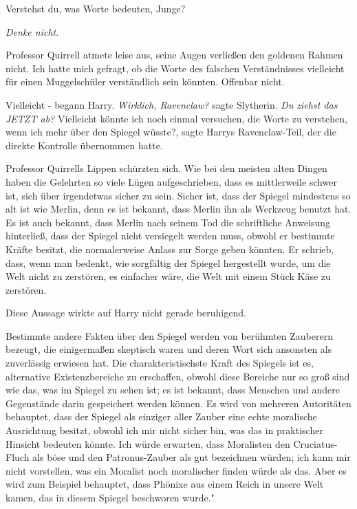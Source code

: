 \glqq{}Verstehst du, was Worte bedeuten, Junge?\grqq{}

\glqq{}\emph{Denke nicht}.\grqq{}

Professor Quirrell atmete leise aus, seine Augen verließen den goldenen Rahmen
nicht. \glqq{}Ich hatte mich gefragt, ob die Worte des falschen Verständnisses
vielleicht für einen Muggelschüler verständlich sein könnten. Offenbar
nicht.\grqq{}

\glqq{}Vielleicht -\grqq{} begann Harry. \emph{Wirklich, Ravenclaw?} sagte
Slytherin. \emph{Du ziehst das JETZT ab?} \glqq{}Vielleicht könnte ich noch
einmal versuchen, die Worte zu verstehen, wenn ich mehr über den Spiegel
wüsste?\grqq{}, sagte Harrys Ravenclaw-Teil, der die direkte Kontrolle
übernommen hatte.

Professor Quirrells Lippen schürzten sich. \glqq{}Wie bei den meisten alten
Dingen haben die Gelehrten so viele Lügen aufgeschrieben, dass es mittlerweile
schwer ist, sich über irgendetwas sicher zu sein. Sicher ist, dass der Spiegel
mindestens so alt ist wie Merlin, denn es ist bekannt, dass Merlin ihn als
Werkzeug benutzt hat. Es ist auch bekannt, dass Merlin nach seinem Tod die
schriftliche Anweisung hinterließ, dass der Spiegel nicht versiegelt werden
muss, obwohl er bestimmte Kräfte besitzt, die normalerweise Anlass zur Sorge
geben könnten. Er schrieb, dass, wenn man bedenkt, wie sorgfältig der Spiegel
hergestellt wurde, um die Welt nicht zu zerstören, es einfacher wäre, die Welt
mit einem Stück Käse zu zerstören.\grqq{}

Diese Aussage wirkte auf Harry nicht gerade beruhigend.

\glqq{}Bestimmte andere Fakten über den Spiegel werden von berühmten Zauberern
bezeugt, die einigermaßen skeptisch waren und deren Wort sich ansonsten als
zuverlässig erwiesen hat. Die charakteristischste Kraft des Spiegels ist es,
alternative Existenzbereiche zu erschaffen, obwohl diese Bereiche nur so groß
sind wie das, was im Spiegel zu sehen ist; es ist bekannt, dass Menschen und
andere Gegenstände darin gespeichert werden können. Es wird von mehreren
Autoritäten behauptet, dass der Spiegel als einziger aller Zauber eine echte
moralische Ausrichtung besitzt, obwohl ich mir nicht sicher bin, was das in
praktischer Hinsicht bedeuten könnte. Ich würde erwarten, dass Moralisten den
Cruciatus-Fluch als \glqq{}böse\grqq{} und den Patronus-Zauber als \glqq
gut\grqq{} bezeichnen würden; ich kann mir nicht vorstellen, was ein Moralist
noch moralischer finden würde als das. Aber es wird zum Beispiel behauptet, dass
Phönixe aus einem Reich in unsere Welt kamen, das in diesem Spiegel beschworen
wurde."


